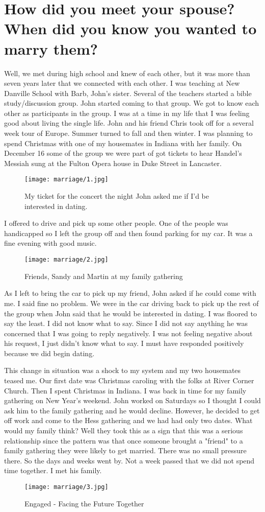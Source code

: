 \section{How did you meet your spouse? When did you know you wanted to marry them?}
Well, we met during high school and knew of each other, but it was more than seven years later that we connected with each other.
I was teaching at New Danville School with Barb, John's sister.
Several of the teachers started a bible study/discussion group.
John started coming to that group.
We got to know each other as participants in the group.
I was at a time in my life that I was feeling good about living the single life.
John and his friend Chris took off for a several week tour of Europe.
Summer turned to fall and then winter.
I was planning to spend Christmas with one of my housemates in Indiana with her family.
On December 16 some of the group we were part of got tickets to hear Handel's Messiah sung at the Fulton Opera house in Duke Street in Lancaster.
\begin{figure}
\centering
\texttt{[image: marriage/1.jpg]}
\caption{
My ticket for the concert the night John asked me if I'd be interested in dating.
}
\end{figure}

I offered to drive and pick up some other people.
One of the people was handicapped so I left the group off and then found parking for my car.
It was a fine evening with good music.
\begin{figure}
\centering
\texttt{[image: marriage/2.jpg]}
\caption{
Friends, Sandy and Martin at my family gathering
}
\end{figure}
As I left to bring the car to pick up my friend, John asked if he could come with me.
I said fine no problem.
We were in the car driving back to pick up the rest of the group when John said that he would be interested in dating.
I was floored to say the least.
I did not know what to say.
Since I did not say anything he was concerned that I was going to reply negatively.
I was not feeling negative about his request, I just didn't know what to say.
I must have responded positively because we did begin dating.

This change in situation was a shock to my system and my two housemates teased me.
Our first date was Christmas caroling with the folks at River Corner Church.
Then I spent Christmas in Indiana.
I was back in time for my family gathering on New Year's weekend.
John worked on Saturdays so I thought I could ask him to the family gathering and he would decline.
However, he decided to get off work and come to the Hess gathering and we had had only two dates.
What would my family think?
Well they took this as a sign that this was a serious relationship since the pattern was that once someone brought a "friend" to a family gathering they were likely to get married.
There was no small pressure there.
So the days and weeks went by.
Not a week passed that we did not spend time together.
I met his family.
\begin{figure}
\centering
\texttt{[image: marriage/3.jpg]}
\caption{
Engaged - Facing the Future Together
}
\end{figure}

